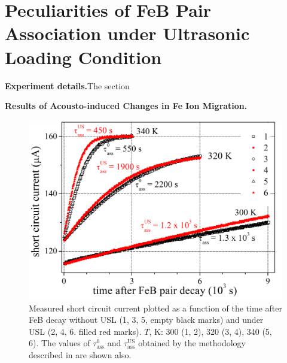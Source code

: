 \documentclass{ttp}
\begin{document}
\section{Peculiarities of FeB Pair Association under Ultrasonic Loading Condition}

\noindent \textbf{Experiment details.}The section



\noindent \textbf{Results of Acousto-induced Changes in Fe Ion Migration.}



\begin{figure}
	\centering
     \includegraphics[width=\linewidth]{Fig1.png}
	  \caption{Measured short circuit current plotted as a function of the time after FeB decay
      without USL (1, 3, 5, empty black marks) and under USL (2, 4, 6. filled red marks).
      $T$, K: 300 (1, 2), 320 (3, 4), 340 (5, 6).
      The values of $\tau_\mathrm{ass}^0$ and $\tau_\mathrm{ass}^\mathrm{US}$ obtained
      by the methodology described in \cite{Olikh2021JAP,Olikh2022:JMatSci} are shown also.
}\label{fig1}
\end{figure}
\end{document}
